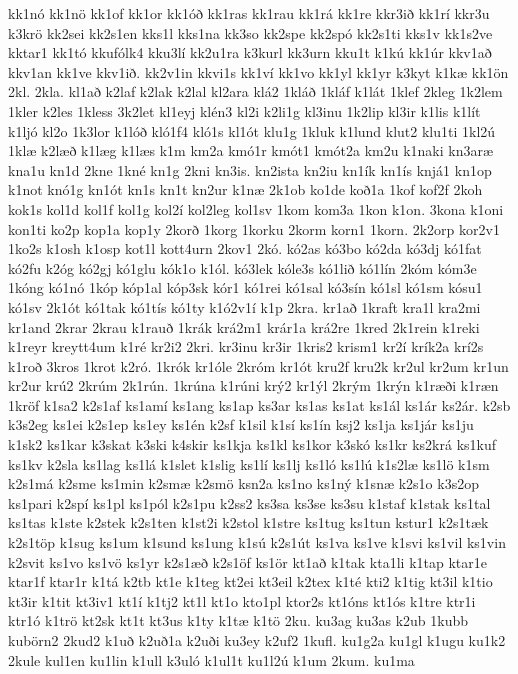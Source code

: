 {kk1nó
kk1nö
kk1of
kk1or
kk1óð
kk1ras
kk1rau
kk1rá
kk1re
kkr3ið
kk1rí
kkr3u
k3krö
kk2sei
kk2s1en
kks1l
kks1na
kk3so
kk2spe
kk2spó
kk2s1ti
kks1v
kk1s2ve
kktar1
kk1tó
kkufólk4
kku3lí
kk2u1ra
k3kurl
kk3urn
kku1t
k1kú
kk1úr
kkv1að
kkv1an
kk1ve
kkv1ið.
kk2v1in
kkvi1s
kk1ví
kk1vo
kk1yl
kk1yr
k3kyt
k1kæ
kk1ön
2kl.
2kla.
kl1að
k2laf
k2lak
k2lal
kl2ara
klá2
1kláð
1kláf
k1lát
1klef
2kleg
1k2lem
1kler
k2les
1kless
3k2let
kl1eyj
klén3
kl2i
k2li1g
kl3inu
1k2lip
kl3ir
k1lis
k1lít
k1ljó
kl2o
1k3lor
k1lóð
kló1f4
kló1s
kl1ót
klu1g
1kluk
k1lund
klut2
klu1ti
1kl2ú
1klæ
k2læð
k1læg
k1læs
k1m
km2a
kmó1r
kmót1
kmót2a
km2u
k1naki
kn3aræ
kna1u
kn1d
2kne
1kné
kn1g
2kni
kn3is.
kn2ista
kn2iu
kn1ík
kn1ís
knjá1
kn1op
k1not
knó1g
kn1ót
kn1s
kn1t
kn2ur
k1næ
2k1ob
ko1de
koð1a
1kof
kof2f
2koh
kok1s
kol1d
kol1f
kol1g
kol2í
kol2leg
kol1sv
1kom
kom3a
1kon
k1on.
3kona
k1oni
kon1ti
ko2p
kop1a
kop1y
2korð
1korg
1korku
2korm
korn1
1korn.
2k2orp
kor2v1
1ko2s
k1osh
k1osp
kot1l
kott4urn
2kov1
2kó.
kó2as
kó3bo
kó2da
kó3dj
kó1fat
kó2fu
k2óg
kó2gj
kó1glu
kók1o
k1ól.
kó3lek
kóle3s
kó1lið
kó1lín
2kóm
kóm3e
1kóng
kó1nó
1kóp
kóp1al
kóp3sk
kór1
kó1rei
kó1sal
kó3sín
kó1sl
kó1sm
kósu1
kó1sv
2k1ót
kó1tak
kó1tís
kó1ty
k1ó2v1í
k1p
2kra.
kr1að
1kraft
kra1l
kra2mi
kr1and
2krar
2krau
k1rauð
1krák
krá2m1
krár1a
krá2re
1kred
2k1rein
k1reki
k1reyr
kreytt4um
k1ré
kr2i2
2kri.
kr3inu
kr3ir
1kris2
krism1
kr2í
krík2a
krí2s
k1roð
3kros
1krot
k2ró.
1krók
kr1óle
2króm
kr1ót
kru2f
kru2k
kr2ul
kr2um
kr1un
kr2ur
krú2
2krúm
2k1rún.
1krúna
k1rúni
krý2
kr1ýl
2krým
1krýn
k1ræði
k1ræn
1kröf
k1sa2
k2s1af
ks1amí
ks1ang
ks1ap
ks3ar
ks1as
ks1at
ks1ál
ks1ár
ks2ár.
k2sb
k3s2eg
ks1ei
k2s1ep
ks1ey
ks1én
k2sf
k1sil
k1sí
ks1ín
ksj2
ks1ja
ks1jár
ks1ju
k1sk2
ks1kar
k3skat
k3ski
k4skir
ks1kja
ks1kl
ks1kor
k3skó
ks1kr
ks2krá
ks1kuf
ks1kv
k2sla
ks1lag
ks1lá
k1slet
k1slig
ks1lí
ks1lj
ks1ló
ks1lú
k1s2læ
ks1lö
k1sm
k2s1má
k2sme
ks1min
k2smæ
k2smö
ksn2a
ks1no
ks1ný
k1snæ
k2s1o
k3s2op
ks1pari
k2spí
ks1pl
ks1pól
k2s1pu
k2ss2
ks3sa
ks3se
ks3su
k1staf
k1stak
ks1tal
ks1tas
k1ste
k2stek
k2s1ten
k1st2i
k2stol
k1stre
ks1tug
ks1tun
kstur1
k2s1tæk
k2s1töp
k1sug
ks1um
k1sund
ks1ung
k1sú
k2s1út
ks1va
ks1ve
k1svi
ks1vil
ks1vin
k2svit
ks1vo
ks1vö
ks1yr
k2s1æð
k2s1öf
ks1ör
kt1að
k1tak
kta1li
k1tap
ktar1e
ktar1f
ktar1r
k1tá
k2tb
kt1e
k1teg
kt2ei
kt3eil
k2tex
k1té
kti2
k1tig
kt3il
k1tio
kt3ir
k1tit
kt3iv1
kt1í
k1tj2
kt1l
kt1o
kto1pl
ktor2s
kt1óns
kt1ós
k1tre
ktr1i
ktr1ó
k1trö
kt2sk
kt1t
kt3us
k1ty
k1tæ
k1tö
2ku.
ku3ag
ku3as
k2ub
1kubb
kubörn2
2kud2
k1uð
k2uð1a
k2uði
ku3ey
k2uf2
1kufl.
ku1g2a
ku1gl
k1ugu
ku1k2
2kule
kul1en
ku1lin
k1ull
k3uló
k1ul1t
ku1l2ú
k1um
2kum.
ku1ma
}
